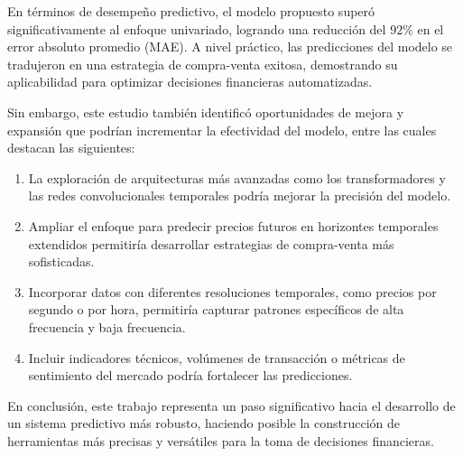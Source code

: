 \documentclass[]{article}
\begin{document}
En términos de desempeño predictivo, el modelo propuesto superó significativamente al enfoque univariado, logrando una reducción del $92\%$ en el error absoluto promedio (MAE). A nivel práctico, las predicciones del modelo se tradujeron en una estrategia de compra-venta exitosa, demostrando su aplicabilidad para optimizar decisiones financieras automatizadas.

Sin embargo, este estudio también identificó oportunidades de mejora y expansión que podrían incrementar la efectividad del modelo, entre las cuales destacan las siguientes:
\begin{enumerate}
	\item La exploración de arquitecturas más avanzadas como los transformadores y las redes convolucionales temporales podría mejorar la precisión del modelo.
	\item Ampliar el enfoque para predecir precios futuros en horizontes temporales extendidos permitiría desarrollar estrategias de compra-venta más sofisticadas.
	
	\item Incorporar datos con diferentes resoluciones temporales, como precios por segundo o por hora, permitiría capturar patrones específicos de alta frecuencia y baja frecuencia.
	
	\item Incluir indicadores técnicos, volúmenes de transacción o métricas de sentimiento del mercado podría fortalecer las predicciones.
\end{enumerate}

En conclusión, este trabajo representa un paso significativo hacia el desarrollo de un sistema predictivo más robusto, haciendo posible la construcción de herramientas más precisas y versátiles para la toma de decisiones financieras.

\newpage


\end{document}
